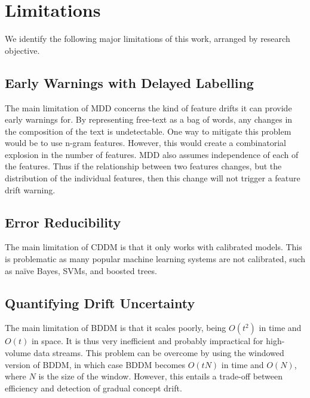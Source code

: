
\section{Limitations} \label{conclusions:limitations}

We identify the following major limitations of this work, arranged by research objective.

\subsection{Early Warnings with Delayed Labelling}

The main limitation of MDD concerns the kind of feature drifts it can provide early warnings for. By representing free-text as a bag of words, any changes in the composition of the text is undetectable. One way to mitigate this problem would be to use n-gram features. However, this would create a combinatorial explosion in the number of features. MDD also assumes independence of each of the features. Thus if the relationship between two features changes, but the distribution of the individual features, then this change will not trigger a feature drift warning.

\subsection{Error Reducibility}

The main limitation of CDDM is that it only works with calibrated models. This is problematic as many popular machine learning systems are not calibrated, such as na\"{i}ve Bayes, SVMs, and boosted trees.

\subsection{Quantifying Drift Uncertainty}

The main limitation of BDDM is that it scales poorly, being $O(t^2)$ in time and $O(t)$ in space. It is thus very inefficient and probably impractical for high-volume data streams. This problem can be overcome by using the windowed version of BDDM, in which case BDDM becomes $O(tN)$ in time and $O(N)$, where $N$ is the size of the window. However, this entails a trade-off between efficiency and detection of gradual concept drift.

